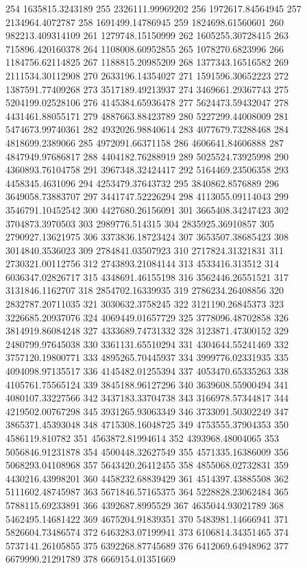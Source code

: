 {254 1635815.3243189
255 2326111.99969202
256 1972617.84564945
257 2134964.4072787
258 1691499.14786945
259 1824698.61560601
260 982213.409314109
261 1279748.15150999
262 1605255.30728415
263 715896.420160378
264 1108008.60952855
265 1078270.6823996
266 1184756.62114825
267 1188815.20985209
268 1377343.16516582
269 2111534.30112908
270 2633196.14354027
271 1591596.30652223
272 1387591.77409268
273 3517189.49213937
274 3469661.29367743
275 5204199.02528106
276 4145384.65936478
277 5624473.59432047
278 4431461.88055171
279 4887663.88423789
280 5227299.44008009
281 5474673.99740361
282 4932026.98840614
283 4077679.73288468
284 4818699.2389066
285 4972091.66371158
286 4606641.84606888
287 4847949.97686817
288 4404182.76288919
289 5025524.73925998
290 4360893.76104758
291 3967348.32424417
292 5164469.23506358
293 4458345.4631096
294 4253479.37643732
295 3840862.8576889
296 3649058.73883707
297 3441747.52226294
298 4113055.09114043
299 3546791.10452542
300 4427680.26156091
301 3665408.34247423
302 3704873.3970503
303 2989776.514315
304 2835925.36910857
305 2790927.13621975
306 3373836.18723424
307 3653507.38685423
308 3014840.3536023
309 2784841.03507923
310 2717824.31321831
311 2730321.00112756
312 2743893.21084144
313 4533416.313512
314 6036347.02826717
315 4348691.46155198
316 3562446.26551521
317 3131846.1162707
318 2854702.16339935
319 2786234.26408856
320 2832787.20711035
321 3030632.3758245
322 3121190.26845373
323 3226685.20937076
324 4069449.01657729
325 3778096.48702858
326 3814919.86084248
327 4333689.74731332
328 3123871.47300152
329 2480799.97645038
330 3361131.65510294
331 4304644.55241469
332 3757120.19800771
333 4895265.70445937
334 3999776.02331935
335 4094098.97135517
336 4145482.01255394
337 4053470.65335263
338 4105761.75565124
339 3845188.96127296
340 3639608.55900494
341 4080107.33227566
342 3437183.33704738
343 3166978.57344817
344 4219502.00767298
345 3931265.93063349
346 3733091.50302249
347 3865371.45393048
348 4715308.16048725
349 4753555.37904353
350 4586119.810782
351 4563872.81994614
352 4393968.48004065
353 5056846.91231878
354 4500448.32627549
355 4571335.16386009
356 5068293.04108968
357 5643420.26412455
358 4855068.02732831
359 4430216.43998201
360 4458232.68839429
361 4514397.43885508
362 5111602.48745987
363 5671846.57165375
364 5228828.23062484
365 5788115.69233891
366 4392687.8995529
367 4635044.93021789
368 5462495.14681422
369 4675204.91839351
370 5483981.14666941
371 5826604.73486574
372 6463283.07199941
373 6106814.34351465
374 5737141.26105855
375 6392268.87745689
376 6412069.64948962
377 6679990.21291789
378 6669154.01351669
}
